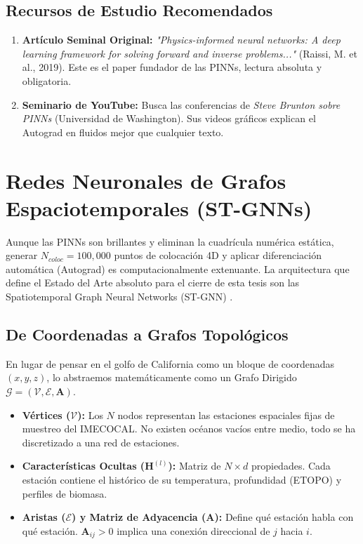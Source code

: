\documentclass[11pt,a4paper]{article}
\begin{document}
\subsection{Recursos de Estudio Recomendados}
\begin{enumerate}
    \item \textbf{Artículo Seminal Original:} \textit{"Physics-informed neural networks: A deep learning framework for solving forward and inverse problems..."} (Raissi, M. et al., 2019). Este es el paper fundador de las PINNs, lectura absoluta y obligatoria.
    \item \textbf{Seminario de YouTube:} Busca las conferencias de \textit{Steve Brunton sobre PINNs} (Universidad de Washington). Sus videos gráficos explican el Autograd en fluidos mejor que cualquier texto.
\end{enumerate}

\newpage
\section{Redes Neuronales de Grafos Espaciotemporales (ST-GNNs)}

Aunque las PINNs son brillantes y eliminan la cuadrícula numérica estática, generar $N_{coloc}=100,000$ puntos de colocación 4D y aplicar diferenciación automática (Autograd) es computacionalmente extenuante. La arquitectura que define el Estado del Arte absoluto para el cierre de esta tesis son las Spatiotemporal Graph Neural Networks (ST-GNN) \cite{bronstein2021, wang2025}.

\subsection{De Coordenadas a Grafos Topológicos}
En lugar de pensar en el golfo de California como un bloque de coordenadas $(x,y,z)$, lo abstraemos matemáticamente como un Grafo Dirigido $\mathcal{G} = (\mathcal{V}, \mathcal{E}, \mathbf{A})$.
\begin{itemize}
    \item \textbf{Vértices ($\mathcal{V}$):} Los $N$ nodos representan las estaciones espaciales fijas de muestreo del IMECOCAL. No existen océanos vacíos entre medio, todo se ha discretizado a una red de estaciones.
    \item \textbf{Características Ocultas ($\mathbf{H}^{(l)}$):} Matriz de $N \times d$ propiedades. Cada estación contiene el histórico de su temperatura, profundidad (ETOPO) y perfiles de biomasa.
    \item \textbf{Aristas ($\mathcal{E}$) y Matriz de Adyacencia ($\mathbf{A}$):} Define qué estación habla con qué estación. $\mathbf{A}_{ij} > 0$ implica una conexión direccional de $j$ hacia $i$.
\end{itemize}
\end{document}
